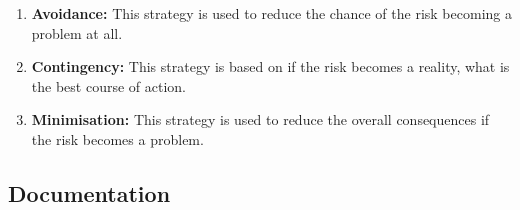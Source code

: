 \documentclass[11pt, a4paper]{report}
\begin{document}
\begin{enumerate}
	\item 
	{\bfseries Avoidance: }This strategy is used to reduce the chance of the risk becoming a problem at all.
	\item 
	{\bfseries Contingency: }This strategy is based on if the risk becomes a reality, what is the best course of action.
	\item 
	{\bfseries Minimisation: }This strategy is used to reduce the overall consequences if the risk becomes a problem.
\end{enumerate}

\subsection{Documentation}
	
\end{document}
